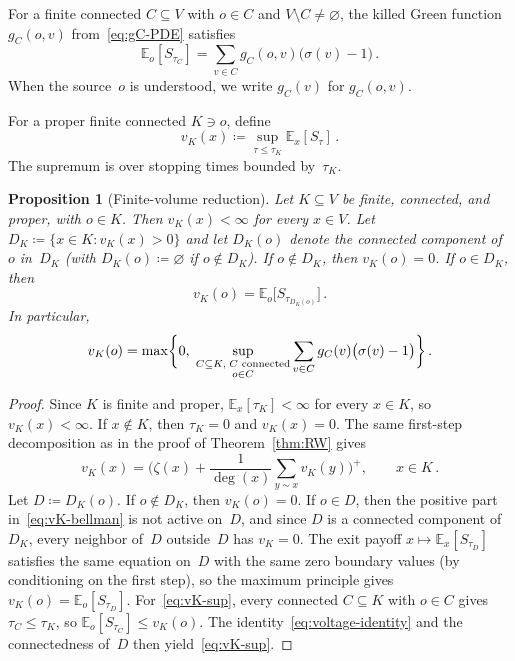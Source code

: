 \documentclass[11pt]{amsart}
\theoremstyle{plain}
\newtheorem{proposition}[theorem]{Proposition}
\theoremstyle{definition}
\newcommand{\E}{\mathbb{E}}
\begin{document}
	For a finite connected $C\subseteq V$ with $o\in C$ and $V\setminus C\neq\varnothing$, the killed Green function $g_C(o,v)$ from~\eqref{eq:gC-PDE} satisfies
	\begin{equation}\label{eq:voltage-identity}
		\E_o[S_{\tau_C}]=\sum_{v\in C}g_C(o,v)\bigl(\sigma(v)-1\bigr)\,.
	\end{equation}
	When the source~$o$ is understood, we write $g_C(v)$ for $g_C(o,v)$.
	
	For a proper finite connected $K\ni o$, define
	\[
	v_K(x)\coloneqq\sup_{\tau\leq\tau_K}\E_x[S_\tau]\,.
	\]
	The supremum is over stopping times bounded by~$\tau_K$.
	
	\begin{proposition}[Finite-volume reduction]\label{prop:finite-vol}
		Let $K\subseteq V$ be finite, connected, and proper, with $o\in K$. Then $v_K(x)<\infty$ for every $x\in V$. Let $D_K\coloneqq\{x\in K:v_K(x)>0\}$ and let $D_K(o)$ denote the connected component of~$o$ in~$D_K$ (with $D_K(o)\coloneqq\varnothing$ if $o\notin D_K$). If $o\notin D_K$, then $v_K(o)=0$. If $o\in D_K$, then
		\begin{equation}
			v_K(o)=\E_o\bigl[S_{\tau_{D_K(o)}}\bigr]\,.
		\end{equation}
		In particular,
		\begin{equation}\label{eq:vK-sup}
			v_K(o)=\max\biggl\{0,\;\sup_{\substack{C\subseteq K,\; C\textup{ connected}\\ o\in C}}\sum_{v\in C}g_C(v)\bigl(\sigma(v)-1\bigr)\biggr\}\,.
		\end{equation}
	\end{proposition}
	
	\begin{proof}
		Since $K$ is finite and proper, $\E_x[\tau_K]<\infty$ for every $x\in K$, so $v_K(x)<\infty$. If $x\notin K$, then $\tau_K=0$ and $v_K(x)=0$. The same first-step decomposition as in the proof of Theorem~\ref{thm:RW} gives
		\begin{equation}\label{eq:vK-bellman}
			v_K(x)=\biggl(\zeta(x)+\frac{1}{\deg(x)}\sum_{y\sim x}v_K(y)\biggr)^{\!+},\qquad x\in K\,.
		\end{equation}
		Let $D\coloneqq D_K(o)$. If $o\notin D_K$, then $v_K(o)=0$. If $o\in D$, then the positive part in~\eqref{eq:vK-bellman} is not active on~$D$, and since $D$ is a connected component of~$D_K$, every neighbor of~$D$ outside~$D$ has $v_K=0$. The exit payoff $x\mapsto\E_x[S_{\tau_D}]$ satisfies the same equation on~$D$ with the same zero boundary values (by conditioning on the first step), so the maximum principle gives $v_K(o)=\E_o[S_{\tau_D}]$.	For~\eqref{eq:vK-sup}, every connected $C\subseteq K$ with $o\in C$ gives $\tau_C\leq\tau_K$, so $\E_o[S_{\tau_C}]\leq v_K(o)$. The identity~\eqref{eq:voltage-identity} and the connectedness of~$D$ then yield~\eqref{eq:vK-sup}.
	\end{proof}
	
\end{document}
